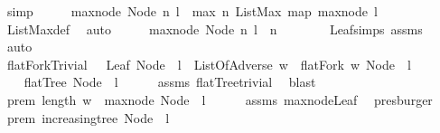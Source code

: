 \begin{isabellebody}
\ simp\isanewline
\ \ \isamarkupfalse%
\ \isamarkupfalse%
\ {\isachardoublequoteopen}max{\isacharunderscore}node\ {\isacharparenleft}Node\ n\ l{\isacharparenright}\ {\isacharequal}\ max\ n\ {\isacharparenleft}ListMax\ {\isacharparenleft}map\ max{\isacharunderscore}node\ l{\isacharparenright}{\isacharparenright}{\isachardoublequoteclose}\isanewline
\ \ \ \ \isamarkupfalse%
\ ListMax{\isacharunderscore}def\ \isamarkupfalse%
\ auto\isanewline
\ \ \isamarkupfalse%
\ \isamarkupfalse%
\ {\isachardoublequoteopen}max{\isacharunderscore}node\ {\isacharparenleft}Node\ n\ l{\isacharparenright}\ {\isacharequal}\ n\ {\isachardoublequoteclose}\isanewline
\ \ \ \ \isamarkupfalse%
\ \ Leaf{\isachardot}simps\ assms\ \isamarkupfalse%
\ auto\isanewline
{}\isamarkupfalse%
%
\endisatagproof
{\isafoldproof}%
%
\isadelimproof
\isanewline
%
\endisadelimproof
\ \ \ \ \isanewline
{}\isamarkupfalse%
\ flatFork{\isacharunderscore}Trivial\ {\isacharcolon}\ \ {\isachardoublequoteopen}Leaf\ {\isacharparenleft}Node\ {}\ l{\isacharparenright}{\isachardoublequoteclose}\ \ {\isachardoublequoteopen}ListOfAdverse\ w{\isachardoublequoteclose}\ \ {\isachardoublequoteopen}flatFork\ w\ {\isacharparenleft}Node\ {}\ l{\isacharparenright}{\isachardoublequoteclose}\ \ \isanewline
%
\isadelimproof
%
\endisadelimproof
%
\isatagproof
{}\isamarkupfalse%
\ {\isacharminus}\ \isanewline
\ \ \isamarkupfalse%
\ {\isachardoublequoteopen}flatTree\ {\isacharparenleft}Node\ {}\ l{\isacharparenright}{\isachardoublequoteclose}\isanewline
\ \ \ \ \isamarkupfalse%
\ assms{\isacharparenleft}{}{\isacharparenright}\ flatTree{\isacharunderscore}trivial\ \isamarkupfalse%
\ blast\isanewline
\ \ \isamarkupfalse%
\ prem{}{\isacharcolon}\ {\isachardoublequoteopen}length\ w\ {\isasymge}\ max{\isacharunderscore}node\ {\isacharparenleft}Node\ {}\ l{\isacharparenright}{\isachardoublequoteclose}\isanewline
\ \ \ \ \isamarkupfalse%
\ assms{\isacharparenleft}{}{\isacharparenright}\ max{\isacharunderscore}node{\isacharunderscore}Leaf\ \isamarkupfalse%
\ presburger\isanewline
\ \ \isamarkupfalse%
\ prem{}{\isacharcolon}\ {\isachardoublequoteopen}increasing{\isacharunderscore}tree\ {\isacharparenleft}Node\ {}\ l{\isacharparenright}{\isachardoublequoteclose}\isanewline

\end{isabellebody}
